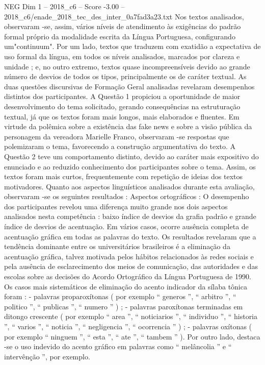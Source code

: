 \begin{textsample}{NEG Dim 1 – 2018\_c6 – Score -3.00 – 2018\_c6/enade\_2018\_tec\_des\_inter\_0a7fad3a23.txt}
Nos textos analisados, observaram -se, assim, vários níveis de atendimento às exigências do padrão formal próprio da modalidade escrita da Língua Portuguesa, configurando um"continuum".
Por um lado, textos que traduzem com exatidão a expectativa de uso formal da língua, em todos os níveis analisados, marcados por clareza e unidade ; e, no outro extremo, textos quase incompreensíveis devido ao grande número de desvios de todos os tipos, principalmente os de caráter textual.
As duas questões discursivas de Formação Geral analisadas revelaram desempenhos distintos dos participantes.
A Questão 1 propiciou a oportunidade de maior desenvolvimento do tema solicitado, gerando consequências na estruturação textual, já que os textos foram mais longos, mais elaborados e fluentes.
Em virtude da polêmica sobre a existência das fake news e sobre a visão pública da personagem da vereadora Marielle Franco, observaram -se respostas que polemizaram o tema, favorecendo a construção argumentativa do texto.
A Questão 2 teve um comportamento distinto, devido ao caráter mais expositivo do enunciado e ao reduzido conhecimento dos participantes sobre o tema.
Assim, os textos foram mais curtos, frequentemente com repetição de ideias dos textos motivadores.
Quanto aos aspectos linguísticos analisados durante esta avaliação, observaram -se os seguintes resultados : Aspectos ortográficos : O desempenho dos participantes revelou uma diferença muito grande nos dois aspectos analisados nesta competência : baixo índice de desvios da grafia padrão e grande índice de desvios de acentuação.
Em vários casos, ocorre ausência completa de acentuação gráfica em todas as palavras do texto.
Os resultados revelaram que a tendência dominante entre os universitários brasileiros é a eliminação da acentuação gráfica, talvez motivada pelos hábitos relacionados às redes sociais e pela ausência de esclarecimento dos meios de comunicação, das autoridades e das escolas sobre as decisões do Acordo Ortográfico da Língua Portuguesa de 1990.
Os casos mais sistemáticos de eliminação do acento indicador da sílaba tônica foram : - palavras proparoxítonas ( por exemplo “ generos ”, “ arbitro ”, “ politico ”, “ publicas ”, “ numero ” ) ; - palavras paroxítonas terminadas em ditongo crescente ( por exemplo “ area ”, “ noticiarios ”, “ individuo ”, “ historia ”, “ varios ”, “ noticia ”, “ negligencia ”, “ ocorrencia ” ) ; - palavras oxítonas ( por exemplo “ ninguem ”, “ esta ”, “ ate ”, “ tambem ” ).
Por outro lado, destaca -se o uso indevido do acento gráfico em palavras como “ melâncolia ” e “ intervênção ”, por exemplo.

\end{textsample}
